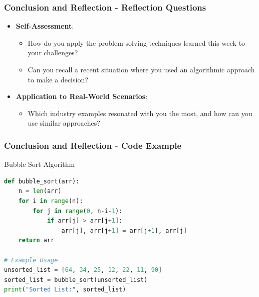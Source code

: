 \documentclass{beamer}
\begin{document}
\begin{frame}[fragile]
    \frametitle{Conclusion and Reflection - Reflection Questions}
    \begin{itemize}
        \item \textbf{Self-Assessment}: 
        \begin{itemize}
            \item How do you apply the problem-solving techniques learned this week to your challenges?
            \item Can you recall a recent situation where you used an algorithmic approach to make a decision?
        \end{itemize}
        
        \item \textbf{Application to Real-World Scenarios}:
        \begin{itemize}
            \item Which industry examples resonated with you the most, and how can you use similar approaches?
        \end{itemize}
    \end{itemize}
\end{frame}

\begin{frame}[fragile]
    \frametitle{Conclusion and Reflection - Code Example}
    \begin{block}{Bubble Sort Algorithm}
    \begin{lstlisting}[language=Python]
def bubble_sort(arr):
    n = len(arr)
    for i in range(n):
        for j in range(0, n-i-1):
            if arr[j] > arr[j+1]:
                arr[j], arr[j+1] = arr[j+1], arr[j]
    return arr

# Example Usage
unsorted_list = [64, 34, 25, 12, 22, 11, 90]
sorted_list = bubble_sort(unsorted_list)
print("Sorted List:", sorted_list)
    \end{lstlisting}
    \end{block}
\end{frame}
\end{document}
